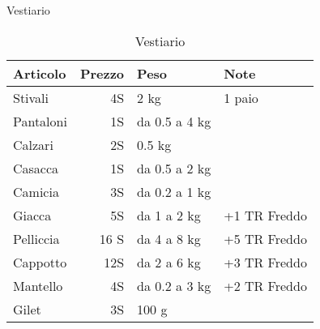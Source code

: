 \begin{table}[p]
  \begin{center}
    {\Large\sc Vestiario}\medskip
    
    \small\begin{tabular}{|p{1.5cm}|r|p{1cm}|p{2.2cm}|}
      \hline
      Articolo& Prezzo& Peso & Note  \\ \hline
      \hline
      Stivali& 4S&  \raggedright 2 kg & 1 paio \\ \hline
      Pantaloni& 1S& \raggedright da 0.5 a 4 kg &\\ \hline
      Calzari& 2S& \raggedright 0.5 kg &\\ \hline
      Casacca& 1S& \raggedright da 0.5 a 2 kg &\\ \hline
      Camicia& 3S& \raggedright da 0.2 a 1 kg &\\ \hline
      Giacca& 5S& \raggedright da 1 a 2 kg & +1 TR Freddo \\ \hline
      Pelliccia& 16 S& \raggedright da 4 a 8 kg & +5 TR Freddo\\ \hline 
      Cappotto&12S& \raggedright da 2 a 6 kg & +3 TR Freddo \\ \hline
      Mantello& 4S& \raggedright da 0.2 a 3 kg & +2 TR Freddo \\ \hline
      Gilet& 3S& \raggedright 100 g &\\ \hline
    \end{tabular}
    \caption{Vestiario}
    \label{tabvestiario}
  \end{center}         
\end{table}



